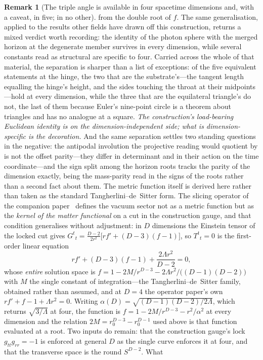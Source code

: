\documentclass[11pt,a4paper]{article}
\theoremstyle{definition}
\newtheorem{remark}[theorem]{Remark}
\begin{document}
\begin{remark}[The triple angle is available in four spacetime dimensions and, with a caveat, in five; in no other]
from the double root of $f$. The same generalisation, applied to the results other fields have drawn off this construction, returns a mixed verdict worth recording: the identity of the photon sphere with the merged horizon at the degenerate member survives in every dimension, while several constants read as structural are specific to four. Carried across the whole of that material, the separation is sharper than a list of exceptions: of the five equivalent statements at the hinge, the two that are the substrate's---the tangent length equalling the hinge's height, and the sides touching the throat at their midpoints---hold at every dimension, while the three that are the equilateral triangle's do not, the last of them because Euler's nine-point circle is a theorem about triangles and has no analogue at a square. \emph{The construction's load-bearing Euclidean identity is on the dimension-independent side; what is dimension-specific is the decoration.} And the same separation settles two standing questions in the negative: the antipodal involution the projective reading would quotient by is not the offset parity---they differ in determinant and in their action on the time coordinate---and the sign split among the horizon roots tracks the parity of the dimension exactly, being the mass-parity read in the signs of the roots rather than a second fact about them. The metric function itself is derived here rather than taken as the standard Tangherlini--de~Sitter form. The slicing operator of the companion paper~\cite{JanzenOperator} defines the vacuum sector not as a metric function but as the \emph{kernel of the matter functional} on a cut in the construction gauge, and that condition generalises without adjustment: in $D$ dimensions the Einstein tensor of the locked cut gives $G^{t}{}_{t}=\tfrac{D-2}{2r^{2}}\bigl[rf'+(D-3)(f-1)\bigr]$, so $T^{t}{}_{t}=0$ is the first-order linear equation
\[
  r f' + (D-3)(f-1) + \frac{2\Lambda r^{2}}{D-2}=0,
\]
whose \emph{entire} solution space is $f=1-2M/r^{D-3}-2\Lambda r^{2}/\bigl((D-1)(D-2)\bigr)$ with $M$ the single constant of integration---the Tangherlini--de~Sitter family, obtained rather than assumed, and at $D=4$ the operator paper's own $rf'+f-1+\Lambda r^{2}=0$. Writing $\alpha(D)=\sqrt{(D-1)(D-2)/2\Lambda}$, which returns $\sqrt{3/\Lambda}$ at four, the function is $f=1-2M/r^{D-3}-r^{2}/\alpha^{2}$ at every dimension and the relation $2M=r_{0}^{D-3}-r_{0}^{D-1}$ used above is that function evaluated at a root. Two inputs do remain: that the construction gauge's lock $g_{tt}g_{rr}=-1$ is enforced at general $D$ as the single curve enforces it at four, and that the transverse space is the round $S^{D-2}$. What

\end{remark}
\end{document}
